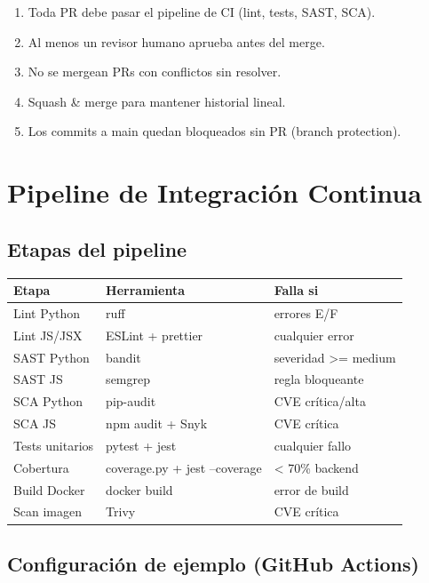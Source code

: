 \documentclass[12pt,a4paper,oneside]{article}
\begin{document}
\begin{enumerate}[leftmargin=*]
  \item Toda PR debe pasar el pipeline de CI (lint, tests, SAST, SCA).
  \item Al menos un revisor humano aprueba antes del merge.
  \item No se mergean PRs con conflictos sin resolver.
  \item Squash & merge para mantener historial lineal.
  \item Los commits a main quedan bloqueados sin PR (branch protection).
\end{enumerate}

\section{Pipeline de Integración Continua}

\subsection{Etapas del pipeline}

\begin{center}
\begin{tabular}{|l|l|l|}
\hline
\rowcolor{accent!20}
\textbf{Etapa} & \textbf{Herramienta} & \textbf{Falla si} \\
\hline
Lint Python & ruff & errores E/F \\
\hline
Lint JS/JSX & ESLint + prettier & cualquier error \\
\hline
SAST Python & bandit & severidad >= medium \\
\hline
SAST JS & semgrep & regla bloqueante \\
\hline
SCA Python & pip-audit & CVE crítica/alta \\
\hline
SCA JS & npm audit + Snyk & CVE crítica \\
\hline
Tests unitarios & pytest + jest & cualquier fallo \\
\hline
Cobertura & coverage.py + jest --coverage & < 70\% backend \\
\hline
Build Docker & docker build & error de build \\
\hline
Scan imagen & Trivy & CVE crítica \\
\hline
\end{tabular}
\end{center}

\subsection{Configuración de ejemplo (GitHub Actions)}
\end{document}

